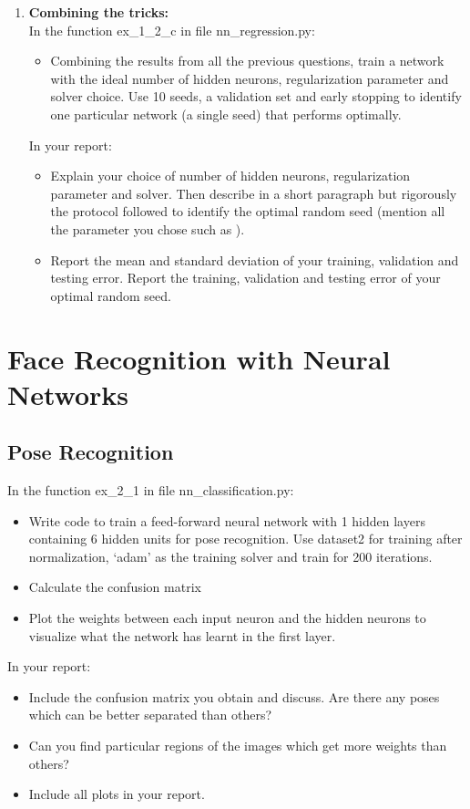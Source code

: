 \documentclass[a4paper]{article}
\begin{document}
\begin{enumerate}[label=(\alph*)]
	\item \textbf{Combining the tricks:}\\
     In the function ex\_1\_2\_c in file nn\_regression.py:
    \begin{itemize}
        \item Combining the results from all the previous questions, train a network with the ideal number of hidden neurons, regularization parameter and solver choice. Use 10 seeds, a validation set and early stopping to identify one particular network (a single seed) that performs optimally.
    \end{itemize}
    In your report:
    \begin{itemize}
        \item Explain your choice of number of hidden neurons, regularization parameter and solver. Then describe in a short paragraph but rigorously the protocol followed to identify the optimal random seed (mention all the parameter you chose such as ).
        \item Report the mean and standard deviation of your training, validation and testing error. Report the training, validation and testing error of your optimal random seed.
    \end{itemize}
\end{enumerate}

\section{Face Recognition with Neural Networks}

\subsection{Pose Recognition}
In the function ex\_2\_1 in file nn\_classification.py:
\begin{itemize}
	\item Write code to train a feed-forward neural network with 1 hidden layers containing 6 hidden units for pose recognition. Use dataset2 for training after normalization, ‘adam’ as the training solver and train for 200 iterations.
    \item Calculate the confusion matrix
    \item Plot the weights between each input neuron and the hidden neurons to visualize what the network has learnt in the first layer.
\end{itemize}
In your report:
\begin{itemize}
\item Include the confusion matrix you obtain and discuss. Are there any poses which can be better separated than others?
\item Can you find particular regions of the images which get more weights than others?
\item Include all plots in your report.
\end{itemize}
\end{document}
